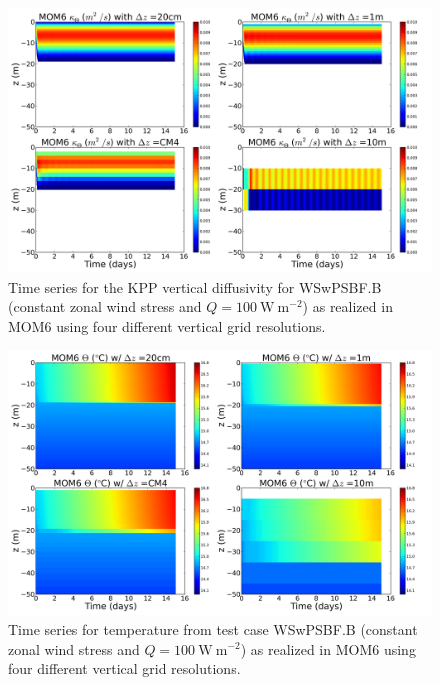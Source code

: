 \begin{figure}[h!t]
\begin{center}
\includegraphics[angle=0,width=14cm]{./figs/MOM6/WSwPSBF_B_MOM6_KPP_diffusivity.png}
\caption[KPP diffusivity from MOM6 for WSwPSBF.B ]{\sf Time series for
  the KPP vertical diffusivity for WSwPSBF.B (constant zonal wind
  stress and $Q=100~\mbox{W}~\mbox{m}^{-2}$) as realized in MOM6 using
  four different vertical grid resolutions.}
\label{fig:WSwPSBF_B_MOM6_KPP_diffusivity}
\end{center}
\end{figure}


\begin{figure}[h!t]
\begin{center}
\includegraphics[angle=0,width=14cm]{./figs/MOM6/WSwPSBF_B_MOM6_temp.png}
\caption[Temperature from MOM6 for WSwPSBF.B ]{\sf Time series for
  temperature from test case WSwPSBF.B (constant zonal wind stress and
  $Q=100~\mbox{W}~\mbox{m}^{-2}$) as realized in MOM6 using four
  different vertical grid resolutions.}
\label{fig:WSwPSBF_B_MOM6_temp}
\end{center}
\end{figure}


